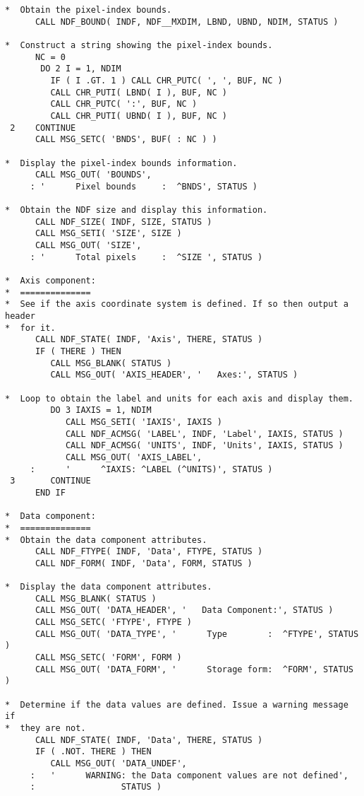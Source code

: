 \begin{verbatim}
*  Obtain the pixel-index bounds.
      CALL NDF_BOUND( INDF, NDF__MXDIM, LBND, UBND, NDIM, STATUS )

*  Construct a string showing the pixel-index bounds.
      NC = 0
       DO 2 I = 1, NDIM
         IF ( I .GT. 1 ) CALL CHR_PUTC( ', ', BUF, NC )
         CALL CHR_PUTI( LBND( I ), BUF, NC )
         CALL CHR_PUTC( ':', BUF, NC )
         CALL CHR_PUTI( UBND( I ), BUF, NC )
 2    CONTINUE
      CALL MSG_SETC( 'BNDS', BUF( : NC ) )

*  Display the pixel-index bounds information.
      CALL MSG_OUT( 'BOUNDS',
     : '      Pixel bounds     :  ^BNDS', STATUS )

*  Obtain the NDF size and display this information.
      CALL NDF_SIZE( INDF, SIZE, STATUS )
      CALL MSG_SETI( 'SIZE', SIZE )
      CALL MSG_OUT( 'SIZE',
     : '      Total pixels     :  ^SIZE ', STATUS )

*  Axis component:
*  ==============
*  See if the axis coordinate system is defined. If so then output a header
*  for it.
      CALL NDF_STATE( INDF, 'Axis', THERE, STATUS )
      IF ( THERE ) THEN
         CALL MSG_BLANK( STATUS )
         CALL MSG_OUT( 'AXIS_HEADER', '   Axes:', STATUS )

*  Loop to obtain the label and units for each axis and display them.
         DO 3 IAXIS = 1, NDIM
            CALL MSG_SETI( 'IAXIS', IAXIS )
            CALL NDF_ACMSG( 'LABEL', INDF, 'Label', IAXIS, STATUS )
            CALL NDF_ACMSG( 'UNITS', INDF, 'Units', IAXIS, STATUS )
            CALL MSG_OUT( 'AXIS_LABEL',
     :      '      ^IAXIS: ^LABEL (^UNITS)', STATUS )
 3       CONTINUE
      END IF

*  Data component:
*  ==============
*  Obtain the data component attributes.
      CALL NDF_FTYPE( INDF, 'Data', FTYPE, STATUS )
      CALL NDF_FORM( INDF, 'Data', FORM, STATUS )

*  Display the data component attributes.
      CALL MSG_BLANK( STATUS )
      CALL MSG_OUT( 'DATA_HEADER', '   Data Component:', STATUS )
      CALL MSG_SETC( 'FTYPE', FTYPE )
      CALL MSG_OUT( 'DATA_TYPE', '      Type        :  ^FTYPE', STATUS )
      CALL MSG_SETC( 'FORM', FORM )
      CALL MSG_OUT( 'DATA_FORM', '      Storage form:  ^FORM', STATUS )

*  Determine if the data values are defined. Issue a warning message if
*  they are not.
      CALL NDF_STATE( INDF, 'Data', THERE, STATUS )
      IF ( .NOT. THERE ) THEN
         CALL MSG_OUT( 'DATA_UNDEF',
     :   '      WARNING: the Data component values are not defined',
     :                 STATUS )


\end{verbatim}

